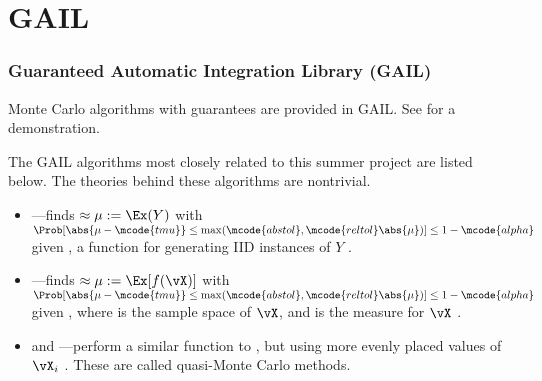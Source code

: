 \documentclass[10pt,compress,xcolor={usenames,dvipsnames}]{beamer} %
\begin{document}
\section{GAIL}
\begin{frame}
\frametitle{Guaranteed Automatic Integration Library (GAIL)}
\vspace{-4ex}
Monte Carlo algorithms with guarantees are provided in GAIL.  See  for a demonstration.

The GAIL algorithms most closely related to this summer project are listed below.  The theories behind these algorithms are nontrivial.
\begin{itemize}
\item {}---finds $\approx \mu:=\Ex(Y)$ with $\Prob[\abs{\mu - \mcode{tmu}} \le \max(\mcode{abstol},\mcode{reltol}\abs{\mu})] \le 1 - \mcode{alpha}$  given , a function for generating IID instances of $Y$  \cite{HicEtal14a}.

\item {}---finds $\approx \mu:=\Ex[f(\vX)]$ with $\Prob[\abs{\mu - \mcode{tmu}} \le \max(\mcode{abstol},\mcode{reltol}\abs{\mu})] \le 1 - \mcode{alpha}$  given , where  is the sample space of $\vX$, and  is the measure for $\vX$  \cite{HicEtal14a}.

\item {} and ---perform a similar function to , but using more evenly placed values of $\vX_i$ \cite{HicJim16a,JimHic16a}.  These are called quasi-Monte Carlo methods.
\end{itemize}

\end{frame}
\end{document}
